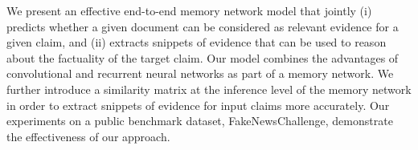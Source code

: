 We present an effective end-to-end memory network model that jointly (i) predicts whether a given document can be considered as relevant evidence for a given claim, and (ii) extracts snippets of evidence that can be used to reason about the factuality of the target claim. Our model combines the advantages of convolutional and recurrent neural networks as part of a memory network. We further introduce a similarity matrix at the inference level of the memory network in order to extract snippets of evidence for input claims more accurately. Our experiments on a public benchmark dataset, FakeNewsChallenge, demonstrate the effectiveness of our approach.
